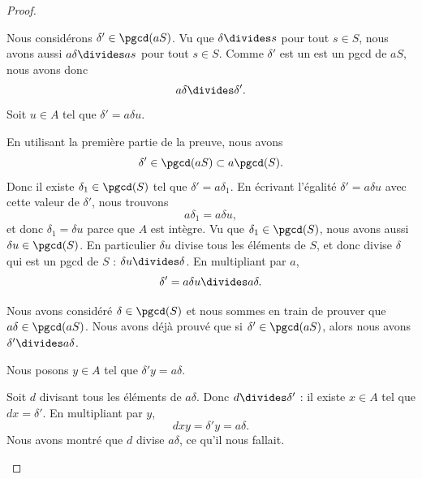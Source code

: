 \begin{proof}
\begin{subproof}
		\begin{subproof}

			Nous considérons \( \delta'\in \pgcd(aS)\). Vu que \( \delta\divides s\) pour tout \( s\in S\), nous avons aussi \( a\delta\divides as\) pour tout \( s\in S\). Comme \( \delta'\) est un est un pgcd de \( aS\), nous avons donc
			\begin{equation}
				a\delta\divides\delta'.
			\end{equation}
			Soit \( u\in A\) tel que \( \delta'=a\delta u\).

			En utilisant la première partie de la preuve, nous avons
			\begin{equation}
				\delta'\in\pgcd(aS)\subset a\pgcd(S).
			\end{equation}
			Donc il existe \( \delta_1\in\pgcd(S)\) tel que \( \delta'=a\delta_1\). En écrivant l'égalité \( \delta' =a\delta u\) avec cette valeur de \( \delta'\), nous trouvons
			\begin{equation}		\label{EQooVHSSooDdVUeW}
				a\delta_1=a\delta u,
			\end{equation}
			et donc \( \delta_1=\delta u\) parce que \( A\) est intègre. Vu que \( \delta_1\in\pgcd(S)\), nous avons aussi \( \delta u\in\pgcd(S)\). En particulier \( \delta u\) divise tous les éléments de \( S\), et donc divise \( \delta\) qui est un pgcd de \( S\) : \( \delta u\divides \delta\). En multipliant par \( a\),
			\begin{equation}
				\delta'=a\delta u\divides a \delta.
			\end{equation}

			\spitem[Résumé]
			Nous avons considéré \( \delta\in\pgcd(S)\) et nous sommes en train de prouver que \( a\delta\in\pgcd(aS)\). Nous avons déjà prouvé que si \( \delta'\in \pgcd(aS)\), alors nous avons \( \delta'\divides a\delta\).

			Nous posons \( y\in A\) tel que \( \delta' y=a\delta\).

			\spitem[Et enfin]
			Soit \( d\) divisant tous les éléments de \( a\delta\). Donc \( d\divides \delta'\) : il existe \( x\in A\) tel que \( dx=\delta'\). En multipliant par \( y\),
			\begin{equation}
				dxy=\delta' y=a\delta.
			\end{equation}
			Nous avons montré que \( d\) divise \( a\delta\), ce qu'il nous fallait.
		\end{subproof}
	\end{subproof}
\end{proof}

